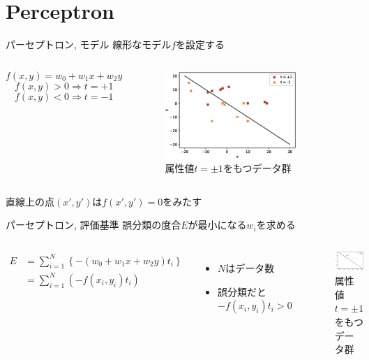 \documentclass[dvipdfmx,platex]{beamer}
\begin{document}
\section{Perceptron}
\begin{frame}{パーセプトロン, モデル}
  線形なモデル$f$を設定する
  \begin{columns}[T,onlytextwidth]
    \[f(x,y)=w_0+w_1x+w_2y\]
    \[f(x,y)>0\Rightarrow t = +1\]
    \[f(x,y)<0\Rightarrow t = -1\]
    \begin{figure}
      \centering
      \includegraphics[width=5cm]{fig/scatter.eps}
      \caption{{\mgfamily 属性値$t=\pm1$をもつデータ群}}
    \end{figure}
  \end{columns}
  直線上の点$(x',y')$は$f(x',y')=0$をみたす
\end{frame}
\begin{frame}{パーセプトロン, 評価基準}
  誤分類の度合$E$が最小になる$w_i$を求める
  \begin{columns}[T,onlytextwidth]
    \begin{align*}
      E
      &=\sum_{i=1}^{N}{\left\{-\left(w_0+w_1x+w_2y\right)t_i\right\}}\\
      &=\sum_{i=1}^{N}{\left(-f(x_i,y_i)t_i\right)}
    \end{align*}
    \begin{itemize}
    \item $N$はデータ数
    \item 誤分類だと$-f(x_i,y_i)t_i>0$
    \end{itemize}
    \begin{figure}
      \centering
      \includegraphics[width=5cm]{fig/scatter.eps}
      \caption{{\mgfamily 属性値$t=\pm1$をもつデータ群}}
    \end{figure}
  \end{columns}
\end{frame}
\end{document}
